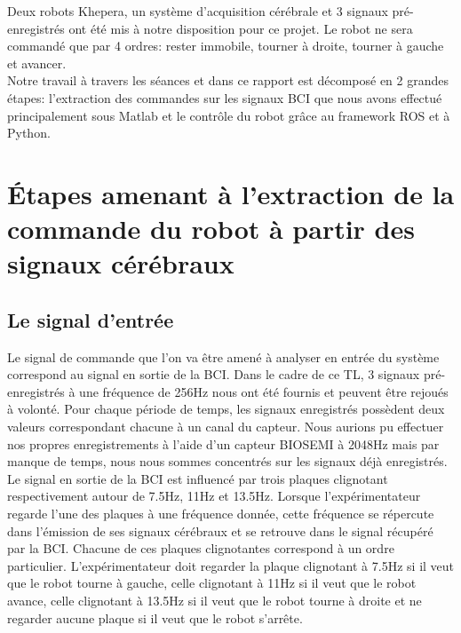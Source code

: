 \documentclass[11pt]{article}
\begin{document}
Deux robots Khepera, un système d'acquisition cérébrale et 3 signaux pré-enregistrés ont été mis à notre disposition pour ce projet. Le robot ne sera commandé que par 4 ordres: rester immobile, tourner à droite, tourner à gauche et avancer.\\

Notre travail à travers les séances et dans ce rapport est décomposé en 2 grandes étapes: l'extraction des commandes sur les signaux BCI que nous avons effectué principalement sous Matlab et le contrôle du robot grâce au framework ROS et à Python.


\cleardoublepage


\section{Étapes amenant à l'extraction de la commande du robot à partir des signaux cérébraux}

\subsection{Le signal d'entrée}

Le signal de commande que l'on va être amené à analyser en entrée du système correspond au signal en sortie de la BCI. Dans le cadre de ce TL, 3 signaux pré-enregistrés à une fréquence de 256Hz nous ont été fournis et peuvent être rejoués à volonté. Pour chaque période de temps, les signaux enregistrés possèdent deux valeurs correspondant chacune à un canal du capteur. Nous aurions pu effectuer nos propres enregistrements à l'aide d'un capteur BIOSEMI à 2048Hz mais par manque de temps, nous nous sommes concentrés sur les signaux déjà enregistrés. \\

Le signal en sortie de la BCI est influencé par trois plaques clignotant respectivement autour de 7.5Hz, 11Hz et 13.5Hz. Lorsque l'expérimentateur regarde l'une des plaques à une fréquence donnée, cette fréquence se répercute dans l'émission de ses signaux cérébraux et se retrouve dans le signal récupéré par la BCI. Chacune de ces plaques clignotantes correspond à un ordre particulier. L'expérimentateur doit regarder la plaque clignotant à 7.5Hz si il veut que le robot tourne à gauche, celle clignotant à 11Hz si il veut que le robot avance, celle clignotant à 13.5Hz si il veut que le robot tourne à droite et ne regarder aucune plaque si il veut que le robot s'arrête.
\end{document}
